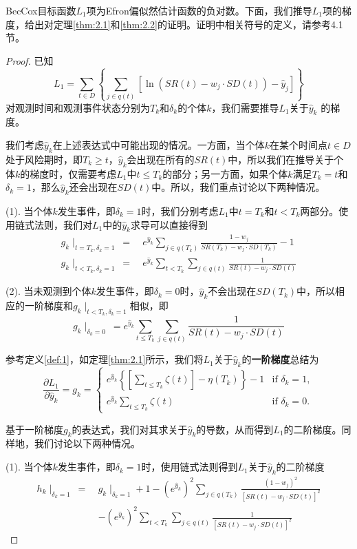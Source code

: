BecCox目标函数$L_1$项为Efron偏似然估计函数的负对数。下面，我们推导$L_1$项的梯度，给出对定理\ref{thm:2.1}和\ref{thm:2.2}的证明。证明中相关符号的定义，请参考4.1节。
\begin{proof}
已知$$L_1 = \sum_{t\in D} \left\{ \sum_{j\in q(t)} [\ln(SR(t)-w_j\cdot SD(t))-\hat{y}_j] \right\}$$ 对观测时间和观测事件状态分别为$T_k$和$\delta_k$的个体$k$，我们需要推导$L_1$关于$\hat{y}_k$ 的梯度。

我们考虑$\hat{y}_k$在上述表达式中可能出现的情况。一方面，当个体$k$在某个时间点$t\in D$处于风险期时，即$T_k\ge t$，$\hat{y}_k$会出现在所有的$SR(t)$中，所以我们在推导关于个体$k$的梯度时，仅需要考虑$L_1$中$t \le T_k$的部分；另一方面，如果个体$k$满足$T_k=t$和$\delta_k=1$，那么$\hat{y}_k$还会出现在$SD(t)$中。所以，我们重点讨论以下两种情况。

(1). 当个体$k$发生事件，即$\delta_k=1$时，我们分别考虑$L_1$中$t=T_k$和$t<T_k$两部分。使用链式法则，我们对$L_1$中的$\hat{y}_k$求导可以直接得到\[
\begin{split}
g_k\mid_{t=T_k,\delta_k=1} \ =\ & e^{\hat{y}_k}\sum_{j\in q(T_k)} \frac{1-w_j}{SR(T_k) - w_j\cdot SD(T_k)} - 1 \\
g_k\mid_{t<T_k,\delta_k=1} \ =\ & e^{\hat{y}_k}\sum_{t<T_k} \sum_{j\in q(t)} \frac{1}{SR(t) - w_j\cdot SD(t)}
\end{split}
\]

(2). 当未观测到个体$k$发生事件，即$\delta_k=0$时，$\hat{y}_k$不会出现在$SD(T_k)$中，所以相应的一阶梯度和$g_k\mid_{t<T_k,\delta_k=1}$相似，即$$
g_k\mid_{\delta_k=0} \ = e^{\hat{y}_k}\sum_{t\le T_k} \sum_{j\in q(t)} \frac{1}{SR(t) - w_j\cdot SD(t)}
$$

参考定义\ref{def:1}，如定理\ref{thm:2.1}所示，我们将$L_1$关于$\hat{y}_k$的\textbf{一阶梯度}总结为$$
\frac{\partial L_1}{\partial \hat{y}_k} = g_k = 
\begin{cases}
e^{\hat{y}_k} \left\{ \left[\sum_{t\le T_k} \zeta(t)\right] - \eta(T_k) \right\} - 1 & \text{if } \delta_k = 1,\\
e^{\hat{y}_k} \sum_{t\le T_k} \zeta(t) & \text{if } \delta_k = 0.
\end{cases}
$$

基于一阶梯度$g_k$的表达式，我们对其求关于$\hat{y}_k$的导数，从而得到$L_1$的二阶梯度。同样地，我们讨论以下两种情况。

(1). 当个体$k$发生事件，即$\delta_k=1$时，使用链式法则得到$L_1$关于$\hat{y}_k$的二阶梯度\[
\begin{split}
h_k\mid_{\delta_k=1}\ =\ & g_k\mid_{\delta_k=1} + 1 - (e^{\hat{y}_k})^2 \sum_{j\in q(T_k)} \frac{(1-w_j)^2}{[SR(t) - w_j\cdot SD(t)]^2} \\
   & -(e^{\hat{y}_k})^2 \sum_{t< T_k} \sum_{j\in q(t)} \frac{1}{[SR(t) - w_j\cdot SD(t)]^2}
\end{split}
\]


\end{proof}
